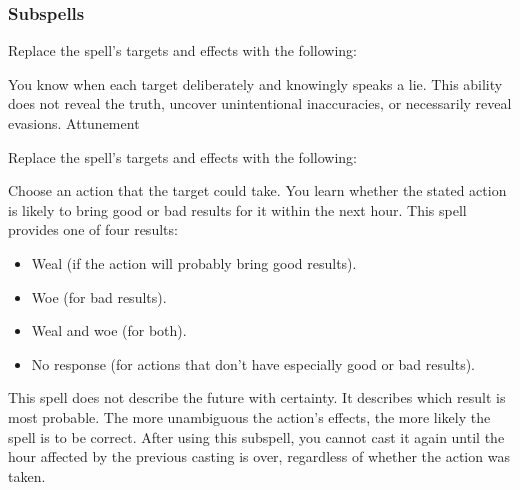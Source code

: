 \subsubsection{Subspells}
Replace the spell's targets and effects with the following:
\begin{spellcontent}
\begin{augmenttargetinginfo}
\end{augmenttargetinginfo}
\begin{augmenteffects}
\spelleffect
You know when each target deliberately and knowingly speaks a lie.
This ability does not reveal the truth, uncover unintentional inaccuracies, or necessarily reveal evasions.
\spelldur Attunement
\end{augmenteffects}
\end{spellcontent}
Replace the spell's targets and effects with the following:
\begin{spellcontent}
\begin{augmenttargetinginfo}
\end{augmenttargetinginfo}
\begin{augmenteffects}
\spelleffect
Choose an action that the target could take.
You learn whether the stated action is likely to bring good or bad results for it within the next hour.
This spell provides one of four results:
\begin{itemize}
\item Weal (if the action will probably bring good results).
\item Woe (for bad results).
\item Weal and woe (for both).
\item No response (for actions that don't have especially good or bad results).
\end{itemize}
This spell does not describe the future with certainty.
It describes which result is most probable.
The more unambiguous the action's effects, the more likely the spell is to be correct.
After using this subspell, you cannot cast it again until the hour affected by the previous casting is over, regardless of whether the action was taken.
\end{augmenteffects}
\end{spellcontent}

